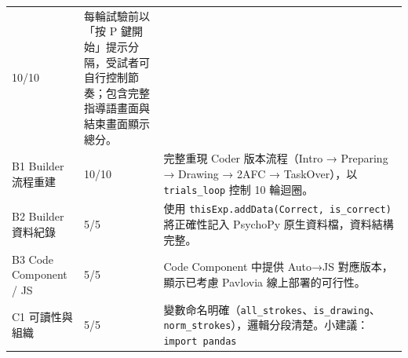 \documentclass[14pt,]{extarticle}
\begin{document}
\begin{longtable}[]{@{}lll@{}}
\begin{minipage}[t]{0.02\columnwidth}
10/10\strut
\end{minipage} & \begin{minipage}[t]{0.81\columnwidth}\raggedright
每輪試驗前以「按 P
鍵開始」提示分隔，受試者可自行控制節奏；包含完整指導語畫面與結束畫面顯示總分。\strut
\end{minipage}\tabularnewline
\begin{minipage}[t]{0.08\columnwidth}\raggedright
B1 Builder 流程重建\strut
\end{minipage} & \begin{minipage}[t]{0.02\columnwidth}\raggedright
10/10\strut
\end{minipage} & \begin{minipage}[t]{0.81\columnwidth}\raggedright
完整重現 Coder 版本流程（Intro → Preparing → Drawing → 2AFC →
TaskOver），以 \texttt{trials\_loop} 控制 10 輪迴圈。\strut
\end{minipage}\tabularnewline
\begin{minipage}[t]{0.08\columnwidth}\raggedright
B2 Builder 資料紀錄\strut
\end{minipage} & \begin{minipage}[t]{0.02\columnwidth}\raggedright
5/5\strut
\end{minipage} & \begin{minipage}[t]{0.81\columnwidth}\raggedright
使用
\texttt{thisExp.addData(\textquotesingle{}Correct\textquotesingle{},\ is\_correct)}
將正確性記入 PsychoPy 原生資料檔，資料結構完整。\strut
\end{minipage}\tabularnewline
\begin{minipage}[t]{0.08\columnwidth}\raggedright
B3 Code Component / JS\strut
\end{minipage} & \begin{minipage}[t]{0.02\columnwidth}\raggedright
5/5\strut
\end{minipage} & \begin{minipage}[t]{0.81\columnwidth}\raggedright
Code Component 中提供 Auto→JS 對應版本，顯示已考慮 Pavlovia
線上部署的可行性。\strut
\end{minipage}\tabularnewline
\begin{minipage}[t]{0.08\columnwidth}\raggedright
C1 可讀性與組織\strut
\end{minipage} & \begin{minipage}[t]{0.02\columnwidth}\raggedright
5/5\strut
\end{minipage} & \begin{minipage}[t]{0.81\columnwidth}\raggedright
變數命名明確（\texttt{all\_strokes}、\texttt{is\_drawing}、\texttt{norm\_strokes}），邏輯分段清楚。小建議：\texttt{import\ pandas}

\end{minipage}
\end{longtable}
\end{document}
